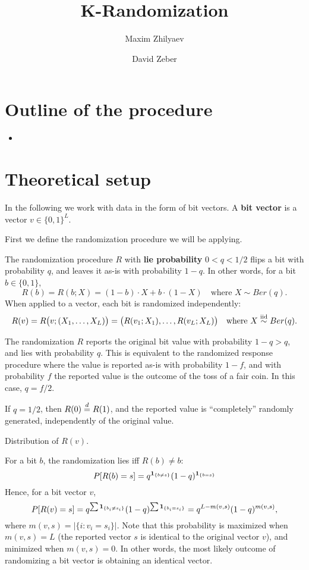 \documentclass[11pt,draft]{article}
\title{K-Randomization}
\author{Maxim Zhilyaev \and David Zeber}
\begin{document}
\maketitle

\section{Outline of the procedure}
\begin{itemize}
   \item 
\end{itemize}

\section{Theoretical setup}
In the following we work with data in the form of bit vectors. A \textbf{bit
vector} is a vector $v \in \{0,1\}^L$.

First we define the randomization procedure we will be applying.

\begin{defn}
    The randomization procedure $R$ with \textbf{lie probability} $0 < q < 1/2$
    flips a bit with probability $q$, and leaves
it as-is with probability $1-q$. 
In other words, for a bit $b \in \{0,1\}$,
\[ R(b) = R(b; X) = (1-b)\cdot X + b \cdot (1-X) \quad\text{where } 
X\sim Ber(q). \]
When applied to a vector, each bit is randomized independently:
\[ R(v) = R\big(v; (X_1,\dots,X_L)\big) = 
    \big(R(v_1; X_1),\dots,R(v_L; X_L)\big) 
\quad\text{where } X \stackrel{\text{iid}}{\sim} Ber(q). \]
\end{defn}

\begin{rmk}
    The randomization $R$ reports the original bit value with probability 
    $1-q > q$, and lies with probability $q$. 
    This is equivalent to the randomized response procedure where the value is 
    reported as-is with probability $1-f$, and with probability $f$ the reported 
    value is the outcome of the toss of a fair coin. 
    In this case, $q = f/2$.
\end{rmk}
\begin{rmk}
    If $q = 1/2$, then $R(0)\stackrel{d}{=} R(1)$, and the reported value is 
    ``completely'' randomly generated, \ie independently of the original value.
\end{rmk}

Distribution of $R(v)$.

For a bit $b$, the randomization lies iff $R(b) \neq b$: 
\[
    P[R(b) = s] = q^{\operatorname{\mathbf{1}}_{\{b \neq s\}}}(1-q)^{\operatorname{\mathbf{1}}_{\{b = s\}}}
\]
Hence, for a bit vector $v$, 
\[ P[R(v) = s] = q^{\sum\operatorname{\mathbf{1}}_{\{b_i \neq s_i\}}}(1-q)^{\sum\operatorname{\mathbf{1}}_{\{b_i = s_i\}}} 
    = q^{L-m(v,s)}(1-q)^{m(v,s)}, \]
where $m(v,s) = |\{i: v_i = s_i\}|$. 
Note that this probability is maximized when $m(v,s) = L$ (the reported vector
$s$ is identical to the original vector $v$), and minimized when $m(v,s) = 0$.
In other words, the most likely outcome of randomizing a bit vector is obtaining
an identical vector.
\end{document}
